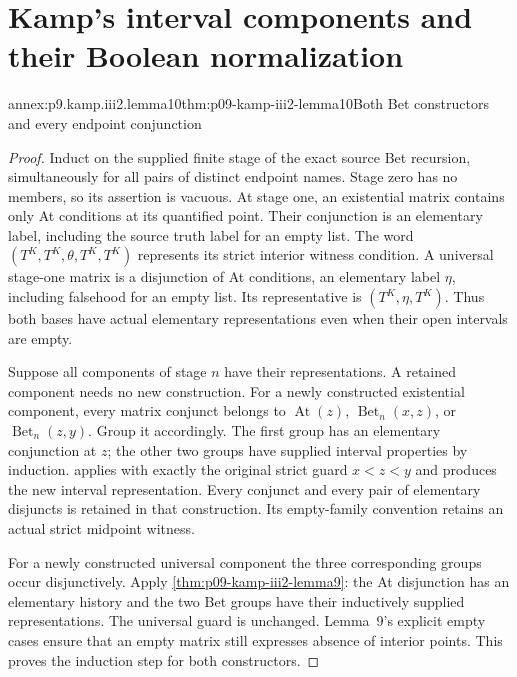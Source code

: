 
\section{Kamp's interval components and their Boolean normalization}
\label{sec:annex-p09-kamp-iii2-lemma10}

\begin{annexitem}{annex:p9.kamp.iii2.lemma10}{thm:p09-kamp-iii2-lemma10}{Both Bet constructors and every endpoint conjunction}
\begin{proof}
Induct on the supplied finite stage of the exact source Bet recursion,
simultaneously for all pairs of distinct endpoint names. Stage zero has
no members, so its assertion is vacuous. At stage one, an existential
matrix contains only At conditions at its quantified point. Their
conjunction is an elementary label, including the source truth label
for an empty list. The word
\((T^K,T^K,\theta,T^K,T^K)\) represents its strict interior
witness condition. A universal stage-one matrix is a disjunction of At
conditions, an elementary label \(\eta\), including falsehood for
an empty list. Its representative is \((T^K,\eta,T^K)\).
Thus both bases have actual elementary representations even when their
open intervals are empty.

Suppose all components of stage \(n\) have their representations.
A retained component needs no new construction. For a newly constructed
existential component, every matrix conjunct belongs to
\(\operatorname{At}(z)\), \(\operatorname{Bet}_n(x,z)\),
or \(\operatorname{Bet}_n(z,y)\). Group it accordingly.
The first group has an elementary conjunction at \(z\);
the other two groups have supplied interval properties by induction.
 applies with exactly the original
strict guard \(x<z<y\) and produces the new interval representation.
Every conjunct and every pair of elementary disjuncts is retained in
that construction. Its empty-family convention retains an actual
strict midpoint witness.

For a newly constructed universal component the three corresponding
groups occur disjunctively. Apply
\cref{thm:p09-kamp-iii2-lemma9}: the At disjunction has an elementary
history and the two Bet groups have their inductively supplied
representations. The universal guard is unchanged. Lemma~9's explicit
empty cases ensure that an empty matrix still expresses absence of
interior points. This proves the induction step for both constructors.


\end{proof}
\end{annexitem}
